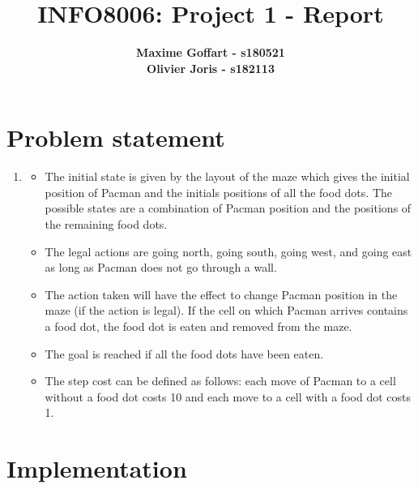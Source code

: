 \documentclass{article}
\begin{document}

\title{\Large{INFO8006: Project 1 - Report}}
\vspace{1cm}
\author{\small{\bf Maxime Goffart - s180521} \\ \small{\bf Olivier Joris - s182113}}

\maketitle


\section{Problem statement}

\begin{enumerate}[label=\alph*.,leftmargin=1.35em]
    \item
    	\begin{itemize}
    		\item The initial state is given by the layout of the maze which gives the initial position of Pacman and the initials positions of all the food dots. The possible states are a combination of Pacman position and the positions of the remaining food dots.
    		\item The legal actions are going north, going south, going west, and going east as long as Pacman does not go through a wall.
    		\item The action taken will have the effect to change Pacman position in the maze (if the action is legal). If the cell on which Pacman arrives contains a food dot, the food dot is eaten and removed from the maze.
    		\item The goal is reached if all the food dots have been eaten.
    		\item The step cost can be defined as follows: each move of Pacman to a cell without a food dot costs 10 and each move to a cell with a food dot costs 1.
    	\end{itemize}
\end{enumerate}

\section{Implementation}
\end{document}
